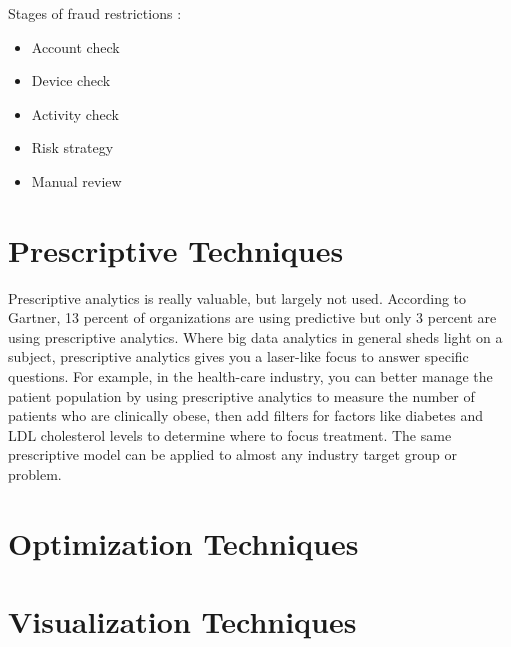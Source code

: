 Stages of fraud restrictions :
\begin{itemize}
	\item Account check
	\item Device check
	\item Activity check
	\item Risk strategy 
	\item Manual review
\end{itemize}

\chapter{Prescriptive Techniques} 
\label{prescriptive-techniques}

Prescriptive analytics is really valuable, but largely not used. According to Gartner, 13 percent of organizations are using predictive but only 3 percent are using prescriptive analytics. Where big data analytics in general sheds light on a subject, prescriptive analytics gives you a laser-like focus to answer specific questions. For example, in the health-care industry, you can better manage the patient population by using prescriptive analytics to measure the number of patients who are clinically obese, then add filters for factors like diabetes and LDL cholesterol levels to determine where to focus treatment. The same prescriptive model can be applied to almost any industry target group or problem.




%
%
%
%

\setlength{\footskip}{8mm}

\chapter{Optimization Techniques} 
\label{optimization-techniques}





%
%
%
%

\setlength{\footskip}{8mm}

\chapter{Visualization Techniques} 
\label{visualization-techniques}





%
%
%
%

\setlength{\footskip}{8mm}

